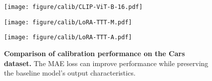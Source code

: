 \begin{figure}[t]
  \centering
    \begin{minipage}{0.32\linewidth}
        \centering
        \texttt{[image: figure/calib/CLIP-ViT-B-16.pdf]}
        \label{fig:calib_baseline}
    \end{minipage}
    \hfill
    \begin{minipage}{0.32\linewidth}
        \centering
        \texttt{[image: figure/calib/LoRA-TTT-M.pdf]}
        \label{fig:calib_telora_m}
    \end{minipage}
    \hfill
    \begin{minipage}{0.32\linewidth}
        \centering
        \texttt{[image: figure/calib/LoRA-TTT-A.pdf]}
        \label{fig:calib_telora_a}
    \end{minipage} 
    \caption{\textbf{Comparison of calibration performance on the Cars dataset.} The MAE loss can improve performance while preserving the baseline model's output characteristics.}
    \label{fig:calib}
\end{figure}


\begin{comment}
\noindent\textbf{Efficiency.}\hspace{5mm} 
Runtime and memory consumption, shown in \cref{fig:runtime} and \cref{fig:memory}, demonstrate the efficiency of our approach compared to TPT.
Our method precomputes text features and eliminates the need for a text encoder during TTT.
This reduces model size and shortens forward pass times both before and after optimization compared to TPT where text encoding often serves as a bottleneck.
Although \name\ has a substantially larger number of trainable parameters than TPT, it limits LoRA application to the deeper layers of the image encoder, reducing memory usage during backpropagation.
Notably, \namemae\ significantly reduces memory usage during backpropagation, primarily by calculating the loss from only 10\% of the augmented images and masking half of the tokens.
Consequently, it requires minimal additional resources even when the MAE loss is included in the total loss.
\name\ achieves higher efficiency than TPT while delivering significantly superior performance.
Based on these results, \name\ is adaptable to a wide range of domains and applications, including streaming data processing \citep{wang2023test,azimi2022self}, from high-stakes environments \citep{wang2022medclip,liu2023clip,dorbala2022clip,khandelwal2022simple} to memory-constrained edge devices \citep{cai2020tinytl,song2023ecotta}.
\end{comment}

